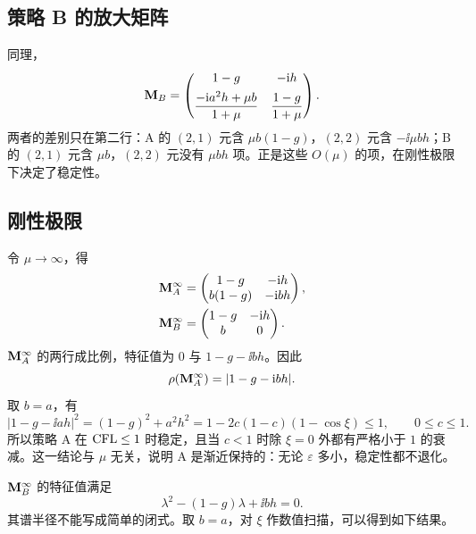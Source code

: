 \subsection{策略 B 的放大矩阵}

同理，
\begin{equation}
  {\mathbf{M}}_B=
  \begin{pmatrix}
    1-g & -\mathrm{i} h\\[4pt]
    \dfrac{-\mathrm{i} a^2h+\mu b}{1+\mu}
    & \dfrac{1-g}{1+\mu}
  \end{pmatrix}.
  \label{eq:M-B}
\end{equation}
两者的差别只在第二行：A 的 $(2,1)$ 元含 $\mu b(1-g)$，$(2,2)$ 元含 $-\ii\mu b h$；B 的 $(2,1)$ 元含 $\mu b$，$(2,2)$ 元没有 $\mu b h$ 项。正是这些 $O(\mu)$ 的项，在刚性极限下决定了稳定性。

\subsection{刚性极限}

令 $\mu\to\infty$，得
\begin{align}
  {\mathbf{M}}_A^\infty&=
  \begin{pmatrix}
    1-g&-\mathrm{i} h\\ b(1-g)&-\mathrm{i} b h
  \end{pmatrix},
  \label{eq:M-A-inf}\\
  {\mathbf{M}}_B^\infty&=
  \begin{pmatrix}
    1-g&-\mathrm{i} h\\ b&0
  \end{pmatrix}.
  \label{eq:M-B-inf}
\end{align}
${\mathbf{M}}_A^\infty$ 的两行成比例，特征值为 $0$ 与 $1-g-\ii bh$。因此
\begin{equation}
  \rho({\mathbf{M}}_A^\infty)=|1-g-\mathrm{i} bh|.
  \label{eq:rho-A}
\end{equation}
取 $b=a$，有
\begin{equation}
  |1-g-\ii ah|^2=(1-g)^2+a^2h^2
  =1-2c(1-c)(1-\cos\xi)\le1,\qquad 0\le c\le1.
  \label{eq:rho-A-bound}
\end{equation}
所以策略 A 在 $\mathrm{CFL}\le1$ 时稳定，且当 $c<1$ 时除 $\xi=0$ 外都有严格小于 $1$ 的衰减。这一结论与 $\mu$ 无关，说明 A 是渐近保持的：无论 $\varepsilon$ 多小，稳定性都不退化。

${\mathbf{M}}_B^\infty$ 的特征值满足
\begin{equation}
  \lambda^2-(1-g)\lambda+\ii bh=0.
  \label{eq:char-B}
\end{equation}
其谱半径不能写成简单的闭式。取 $b=a$，对 $\xi$ 作数值扫描，可以得到如下结果。

